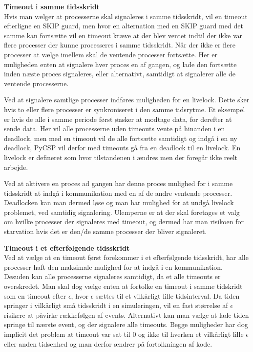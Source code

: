 \textbf{Timeout i samme tidsskridt}\\
Hvis man vælger at processerne skal signaleres i samme tidsskridt, vil en 
timeout efterligne en SKIP guard, men hvor en alternation med en SKIP guard 
med det samme kan fortsætte vil en timeout kræve at der blev ventet indtil der 
ikke var flere processer der kunne processeres i samme tidsskridt. Når der 
ikke er flere processer at vælge imellem skal de ventende processer fortsætte. 
Her er muligheden enten at signalere hver proces en af gangen, og lade den 
fortsætte inden næste proces signaleres, eller alternativt, samtidigt at 
signalerer alle de ventende processerne.

Ved at signalere samtlige processer indføres muligheden for en livelock. Dette
sker hvis to eller flere processer er  synkroniseret i den samme tidsrytme.
Et eksempel er hvis de alle i samme periode først ønsker at modtage data, for 
derefter at sende data. Her vil alle processerne uden timeouts vente på 
hinanden i en deadlock, men med en timeout vil de alle fortsætte samtidigt og 
indgå i en ny deadlock, PyCSP vil derfor med timeouts gå fra en deadlock til 
en livelock. En livelock er defineret som hvor tilstandenen i ændres men der
foregår ikke reelt arbejde. 

Ved at aktivere en proces ad gangen har denne proces mulighed for i samme 
tidsskridt at indgå i kommunikation med en af de andre ventende processer. 
Deadlocken kan man dermed løse og man har mulighed for at undgå livelock 
problemet, ved samtidig signalering.
Ulemperne er at der skal foretages et valg om hvilke processer der signaleres 
med  timeout, og dermed har man risikoen for starvation hvis det 
er den/de samme processer der bliver signaleret.

\textbf{Timeout i et efterfølgende tidsskridt}\\
Ved at vælge at en timeout først forekommer i et efterfølgende tidsskridt, har 
alle processer haft den maksimale mulighed for at indgå i en kommunikation. 
Desuden kan alle processerne signaleres samtidigt, da et alle  timeouts er 
overskredet. Man skal dog vælge enten at fortolke en timeout i samme tidskridt  
som en timeout efter $\epsilon$, hvor $\epsilon$ sættes til et vilkårligt 
lille tidsinterval. Da tiden springer i vilkårligt små tidsskridt i  en 
simuleringen, vil en fast størrelse af $\epsilon$ risikere at påvirke 
rækkefølgen af events. Alternativt kan man vælge at lade tiden springe til 
nærste event, og der signalere alle timeouts. Begge muligheder har dog 
implicit det problem at timeout var sat til 0 og ikke til hverken et 
vilkårligt lille $\epsilon$ eller anden tidsenhed og man derfor ændrer på 
fortolkningen af kode.

